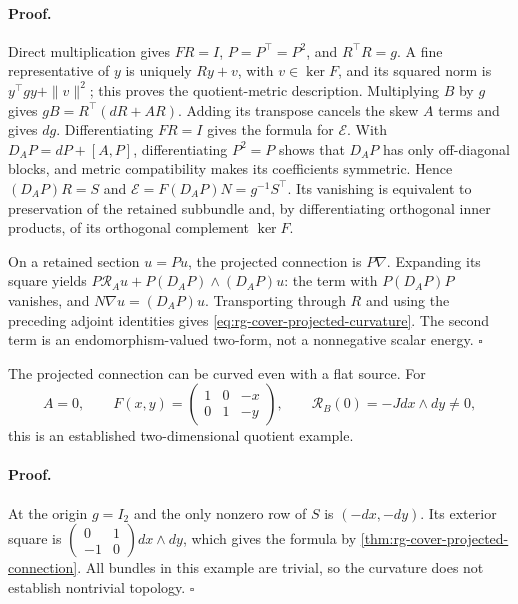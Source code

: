 \paragraph{Proof.}
Direct multiplication gives \(FR=I\), \(P=P^\top=P^2\), and
\(R^\top R=g\). A fine representative of \(y\) is uniquely
\(Ry+v\), with \(v\in\ker F\), and its squared norm is
\(y^\top gy+\|v\|^2\); this proves the quotient-metric description.
Multiplying \(B\) by \(g\) gives
\(gB=R^\top(dR+AR)\). Adding its transpose cancels the skew \(A\)
terms and gives \(dg\). Differentiating \(FR=I\) gives the formula
for \(\mathcal E\). With \(D_AP=dP+[A,P]\), differentiating
\(P^2=P\) shows that \(D_AP\) has only off-diagonal blocks, and
metric compatibility makes its coefficients symmetric. Hence
\((D_AP)R=S\) and
\(\mathcal E=F(D_AP)N=g^{-1}S^\top\). Its vanishing is equivalent
to preservation of the retained subbundle and, by differentiating orthogonal
inner products, of its orthogonal complement \(\ker F\).

On a retained section \(u=Pu\), the projected connection is \(P\nabla\).
Expanding its square yields
\(P\mathcal R_Au+P(D_AP)\wedge(D_AP)u\): the term with
\(P(D_AP)P\) vanishes, and \(N\nabla u=(D_AP)u\).
Transporting through \(R\) and using the preceding adjoint identities gives
\cref{eq:rg-cover-projected-curvature}. The second term is an
endomorphism-valued two-form, not a nonnegative scalar energy.
\(\square\)

The projected connection can be curved even with a flat source. For
\begin{equation}
 A=0,\qquad F(x,y)=\begin{pmatrix}1&0&-x\\0&1&-y\end{pmatrix},
 \qquad \mathcal R_B(0)=-J dx\wedge dy\ne0,
\label{eq:rg-cover-projected-curvature-example}
\end{equation}
this is an established two-dimensional quotient example.

\paragraph{Proof.}
At the origin \(g=I_2\) and the only nonzero row of \(S\) is
\((-dx,-dy)\). Its exterior square is
\(\left(\begin{smallmatrix}0&1\\-1&0\end{smallmatrix}\right)
 dx\wedge dy\), which gives the formula by
\cref{thm:rg-cover-projected-connection}. All bundles in this example
are trivial, so the curvature does not establish nontrivial topology.
\(\square\)

